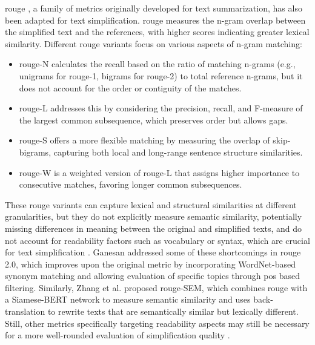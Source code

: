 \gls{rouge} \cite{xu-etal-2016-optimizing}, a family of metrics originally developed for text summarization, has also been adapted for text simplification.
\gls{rouge} measures the n-gram overlap between the simplified text and the references, with higher scores indicating greater lexical similarity.
Different \gls{rouge} variants focus on various aspects of n-gram matching:
\begin{itemize}
    \item \gls{rouge}-N calculates the recall based on the ratio of matching n-grams (e.g., unigrams for \gls{rouge}-1, bigrams for \gls{rouge}-2) to total reference n-grams, but it does not account for the order or contiguity of the matches. 
    \item \gls{rouge}-L addresses this by considering the precision, recall, and F-measure of the largest common subsequence, which preserves order but allows gaps. 
    \item \gls{rouge}-S offers a more flexible matching by measuring the overlap of skip-bigrams, capturing both local and long-range sentence structure similarities. 
    \item \gls{rouge}-W is a weighted version of \gls{rouge}-L that assigns higher importance to consecutive matches, favoring longer common subsequences.
\end{itemize}
These \gls{rouge} variants can capture lexical and structural similarities at different granularities, but they do not explicitly measure semantic similarity, potentially missing differences in meaning between the original and simplified texts, and do not account for readability factors such as vocabulary or syntax, which are crucial for text simplification \cite{xu2024reasoningcomparisonllmenhancedsemantic}.
Ganesan \cite{ganesan2018rouge20updatedimproved} addressed some of these shortcomings in \gls{rouge} 2.0, which improves upon the original metric by incorporating WordNet-based synonym matching and allowing evaluation of specific topics through \gls{pos} based filtering. Similarly, Zhang et al. \cite{ZHANG2024121364} proposed \gls{rouge}-SEM, which combines \gls{rouge} with a Siamese-BERT network to measure semantic similarity and uses back-translation to rewrite texts that are semantically similar but lexically different.
Still, other metrics specifically targeting readability aspects may still be necessary for a more well-rounded evaluation of simplification quality \cite{li2024largelanguagemodelsbiomedical}.

